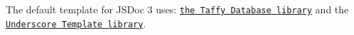 The default template for J\+S\+Doc 3 uses\+: \href{http://taffydb.com/}{\tt the Taffy Database library} and the \href{http://documentcloud.github.com/underscore/#template}{\tt Underscore Template library}. 